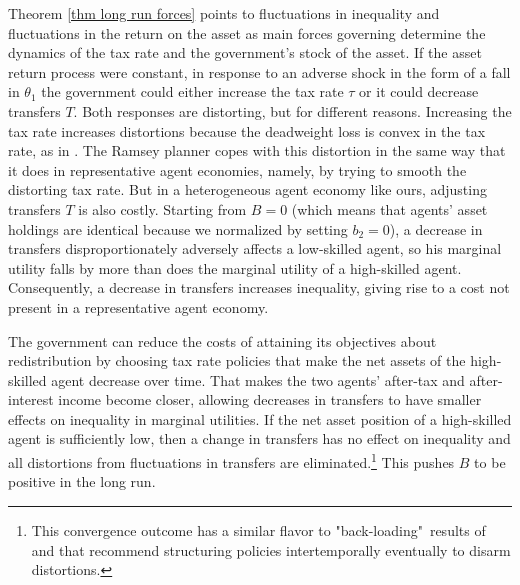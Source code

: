 \documentclass[thmsb,11pt]{article}
\begin{document}
Theorem \ref{thm long run forces}  points to fluctuations in inequality and fluctuations in the return on the asset as main forces governing  determine the dynamics of the  tax rate
and the government's stock of the asset. If the  asset return process were constant, in response  to an adverse  shock in the form of a fall in $\theta_1$
the government could either increase the  tax rate $%
\tau $ or it could decrease transfers $T.$ Both  responses are distorting,
but for different reasons. Increasing the tax rate increases distortions because the deadweight loss is convex in the tax rate,
 as in \cite{Barro1979}. The Ramsey planner copes with this distortion  %
  in the same way that it does in  representative agent economies, namely, by trying to smooth the distorting tax rate.
 \color{black}
 But in a  heterogeneous agent economy like ours,  adjusting transfers $T$ is
also costly. Starting from $B=0$ (which means that    agents' asset holdings are identical  because we normalized by setting $b_2=0$),
a decrease in transfers  disproportionately adversely
affects a low-skilled agent, so his marginal utility
falls by more than does the marginal utility of a high-skilled agent. Consequently, a
decrease in transfers increases inequality, giving rise to a cost  not present in a representative agent economy.

The government can reduce the costs of  attaining its objectives about  redistribution  by choosing
tax rate policies that make the net assets of  the high-skilled agent
decrease over time. That makes the two agents'
after-tax and after-interest income  become closer, allowing decreases in transfers to have smaller effects on inequality in
marginal utilities. If the net asset position of a high-skilled agent is
sufficiently low, then a change in transfers has no effect on inequality and
all  distortions from fluctuations in transfers are eliminated.\footnote{This convergence outcome has
 a similar flavor to "back-loading"\ results  of
 \cite{Ray2002} and \cite{Albanesi2012} that recommend structuring policies intertemporally eventually to disarm  distortions.} This pushes $B$ to be positive in the long run.




%
\end{document}
